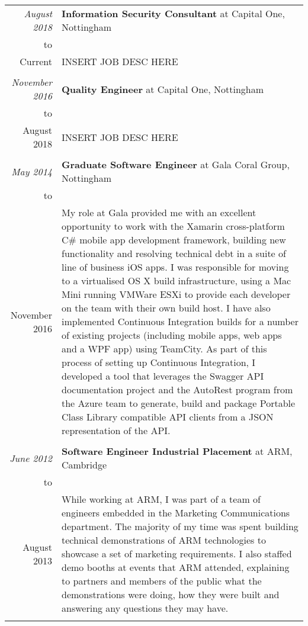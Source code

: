 \documentclass[a4paper,10pt]{article} %
\begin{document}
\begin{longtable}{r|p{16cm}}

\emph{August 2018} & \textbf{Information Security Consultant} at Capital One, Nottingham \\
to & \\
Current & INSERT JOB DESC HERE \\
\multicolumn{2}{c}{} \\

\emph{November 2016} & \textbf{Quality Engineer} at Capital One, Nottingham \\
to & \\
August 2018 & INSERT JOB DESC HERE \\
\multicolumn{2}{c}{} \\

\emph{May 2014} & \textbf{Graduate Software Engineer} at Gala Coral Group, Nottingham \\
to & \\
November 2016 & My role at Gala provided me with an excellent opportunity to work with the Xamarin cross-platform C\# mobile app development framework, building new functionality and resolving technical debt in a suite of line of business iOS apps. I was responsible for moving to a virtualised OS X build infrastructure, using a Mac Mini running VMWare ESXi to provide each developer on the team with their own build host. I have also implemented Continuous Integration builds for a number of existing projects (including mobile apps, web apps and a WPF app) using TeamCity. As part of
this process of setting up Continuous Integration, I developed a tool that leverages the Swagger API documentation project and the AutoRest program from the Azure team to generate, build and package Portable Class Library compatible API clients from a JSON representation of the API. \\
\multicolumn{2}{c}{} \\

\emph{June 2012} & \textbf{Software Engineer Industrial Placement} at ARM, Cambridge \\
to & \\
August 2013 & While working at ARM, I was part of a team of engineers embedded in the Marketing Communications department. The majority of my time was spent building technical demonstrations of ARM technologies to showcase a set of marketing requirements. I also staffed demo booths at events that ARM attended, explaining to partners and members of the public what the demonstrations were doing, how they were built and answering any questions they may have. \\
\multicolumn{2}{c}{} \\


\end{longtable}
\end{document}
